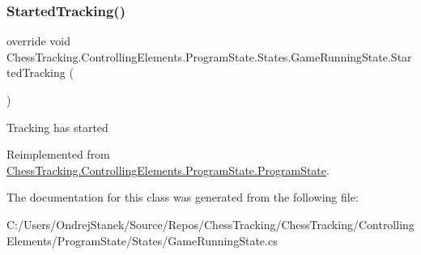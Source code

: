 \subsubsection{\texorpdfstring{StartedTracking()}{StartedTracking()}}
{\footnotesize\ttfamily override void Chess\+Tracking.\+Controlling\+Elements.\+Program\+State.\+States.\+Game\+Running\+State.\+Started\+Tracking (\begin{DoxyParamCaption}{ }\end{DoxyParamCaption})\hspace{0.3cm}{\ttfamily [virtual]}}



Tracking has started 



Reimplemented from \mbox{\hyperlink{class_chess_tracking_1_1_controlling_elements_1_1_program_state_1_1_program_state_a633786bcd19a9f94d568115db3cdb5d9}{Chess\+Tracking.\+Controlling\+Elements.\+Program\+State.\+Program\+State}}.



The documentation for this class was generated from the following file\+:\begin{DoxyCompactItemize}
\item 
C\+:/\+Users/\+Ondrej\+Stanek/\+Source/\+Repos/\+Chess\+Tracking/\+Chess\+Tracking/\+Controlling\+Elements/\+Program\+State/\+States/Game\+Running\+State.\+cs\end{DoxyCompactItemize}
